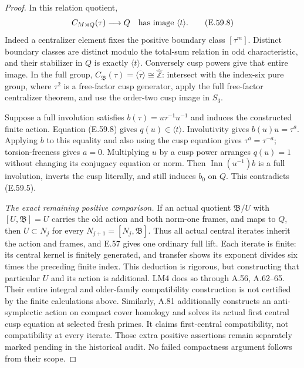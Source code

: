 \begin{proof}
In this relation quotient,
\[
 C_{M\rtimes Q}(\tau)\longrightarrow Q
       \quad\hbox{has image }\langle t\rangle.           \tag{E.59.8}
\]
Indeed a centralizer element fixes the positive boundary class
\([\tau^m]\). Distinct boundary classes are distinct modulo the
total-sum relation in odd characteristic, and their stabilizer in
\(Q\) is exactly \(\langle t\rangle\). Conversely cusp
powers give that entire image.
In the full group,
\(C_{\mathfrak B}(\tau)=\overline{\langle\tau\rangle}
\cong\widehat{\mathbb Z}\): intersect with the index-six pure
group, where \(\tau^2\) is a free-factor cusp generator, apply
the full free-factor centralizer theorem, and use the order-two
cusp image in \(S_3\).

Suppose a full involution satisfies
\(b(\tau)=u\tau^{-1}u^{-1}\) and induces the constructed
finite action. Equation (E.59.8) gives \(q(u)\in\langle t\rangle\).
Involutivity gives \(b(u)u=\tau^a\). Applying \(b\) to
this equality and also using the cusp equation gives
\(\tau^a=\tau^{-a}\); torsion-freeness gives \(a=0\).
Multiplying \(u\) by a cusp power arranges \(q(u)=1\)
without changing its conjugacy equation or norm. Then
\(\operatorname{Inn}(u^{-1})b\) is a full involution,
inverts the cusp literally, and still induces \(b_0\) on
\(Q\). This contradicts (E.59.5).

\emph{The exact remaining positive comparison.}
If an actual quotient \(\mathfrak B/U\) with
\([U,\mathfrak B]=U\) carries the old action and both norm-one
frames, and maps to \(Q\), then \(U\subset N_j\) for every
\(N_{j+1}=[N_j,\mathfrak B]\). Thus all actual central iterates
inherit the action and frames, and E.57 gives one ordinary full
lift. Each iterate is finite: its central kernel is finitely generated,
and transfer shows its exponent divides six times the preceding
finite index. This deduction is rigorous, but constructing that
particular \(U\) and its action is additional. LM4 does so through
A.56, A.62--65. Their entire integral and older-family compatibility
construction is not certified by the finite calculations above.
Similarly, A.81 additionally constructs an anti-symplectic action on
compact cover homology and solves its actual first central cusp
equation at selected fresh primes. It claims first-central
compatibility, not compatibility at every iterate. Those extra
positive assertions remain separately marked pending in the historical
audit. No failed compactness argument follows from their scope.
\end{proof}
